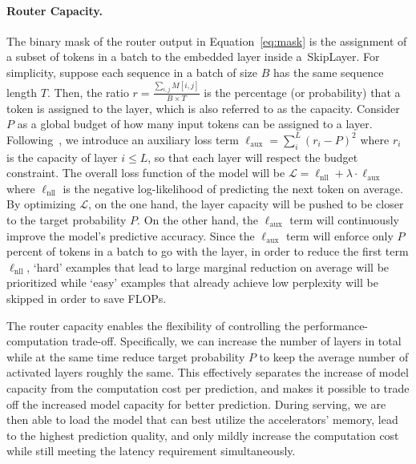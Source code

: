 \documentclass{article}
\newcommand{\skipl}{SkipLayer\xspace}
\begin{document}

\paragraph{Router Capacity.}
\label{section:aux_loss}
The binary mask of the router output in Equation~\ref{eq:mask} is the assignment of a subset of tokens in a batch to the embedded layer inside a~\skipl. For simplicity, suppose each sequence in a batch of size $B$ has the same sequence length $T$. Then, the ratio $r=\frac{\sum_{i,j}M[i, j]}{B\times T}$ is the percentage (or probability) that a token is assigned to the layer, which is also referred to as the capacity. Consider $P$ as a global budget of how many input tokens can be assigned to a layer. Following~\cite{du2022glam, lepikhin2020gshard}, we introduce an auxiliary loss term $\ell_{\text{aux}} = \sum_i^L(r_i - P)^2$ where $r_i$ is the capacity of layer $i\leq L$, so that each layer will respect the budget constraint. The overall loss function of the model will be $\mathcal{L} = \ell_{\text{nll}} + \lambda\cdot\ell_{\text{aux}}$ where $\ell_{\text{nll}}$ is the negative log-likelihood of predicting the next token on average. By optimizing $\mathcal{L}$, on the one hand, the layer capacity will be pushed to be closer to the target probability $P$. On the other hand, the $\ell_{\text{aux}}$ term will continuously improve the model's predictive accuracy. Since the $\ell_{\text{aux}}$ term will enforce only $P$ percent of tokens in a batch to go with the layer, in order to reduce the first term $\ell_{\text{nll}}$, `hard' examples that lead to large marginal reduction on average will be prioritized while `easy' examples that already achieve low perplexity will be skipped in order to save FLOPs.

The router capacity enables the flexibility of controlling the performance-computation trade-off. Specifically, we can increase the number of layers in total while at the same time reduce target probability $P$ to keep the average number of activated layers roughly the same. This effectively separates the increase of model capacity from the computation cost per prediction, and makes it possible to trade off the increased model capacity for better prediction. During serving, we are then able to load the model that can best utilize the accelerators' memory, lead to the highest prediction quality, and only mildly increase the computation cost while still meeting the latency requirement simultaneously.
\end{document}
